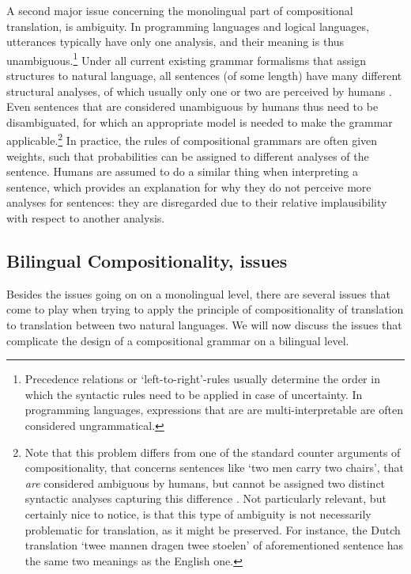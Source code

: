 A second major issue concerning the monolingual part of compositional translation, is ambiguity. In programming languages and logical languages, utterances typically have only one analysis, and their meaning is thus unambiguous.\footnote{Precedence relations or `left-to-right'-rules usually determine the order in which the syntactic rules need to be applied in case of uncertainty. In programming languages, expressions that are are multi-interpretable are often considered ungrammatical.} Under all current existing grammar formalisms that assign structures to natural language, all sentences (of some length) have many different structural analyses, of which usually only one or two are perceived by humans \citep{scha1990taaltheorie}. Even sentences that are considered unambiguous by humans thus need to be disambiguated, for which an appropriate model is needed to make the grammar applicable.\footnote{Note that this problem differs from one of the standard counter arguments of compositionality, that concerns sentences like `two men carry two chairs', that \textit{are} considered ambiguous by humans, but cannot be assigned two distinct syntactic analyses capturing this difference \citep{pelletier1994principle}. Not particularly relevant, but certainly nice to notice, is that this type of ambiguity is not necessarily problematic for translation, as it might be preserved. For instance, the Dutch translation `twee mannen dragen twee stoelen' of aforementioned sentence has the same two meanings as the English one.}  In practice, the rules of compositional grammars are often given weights, such that probabilities can be assigned to different analyses of the sentence. Humans are assumed to do a similar thing when interpreting a sentence, which provides an explanation for why they do not perceive more analyses for sentences: they are disregarded due to their relative implausibility with respect to another analysis.

\subsection{Bilingual Compositionality, issues}
\label{subsec:bilingual_problems}

Besides the issues going on on a monolingual level, there are several issues that come to play when trying to apply the principle of compositionality of translation to translation between two natural languages. We will now discuss the issues that complicate the design of a compositional grammar on a bilingual level.


